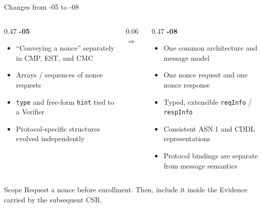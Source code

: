 \documentclass[aspectratio=169,10pt]{beamer}
\begin{document}
\begin{frame}{Changes from -05 to -08}
  \begin{columns}[T,onlytextwidth]
    \begin{column}{0.47\textwidth}
      \textbf{\color{darkgray}-05}
      \vspace{0.12cm}
      \begin{itemize}
        \item ``Conveying a nonce'' separately in CMP, EST, and CMC
        \item Arrays / sequences of nonce requests
        \item \texttt{type} and free-form \texttt{hint} tied to a Verifier
        \item Protocol-specific structures evolved independently
      \end{itemize}
    \end{column}
    \begin{column}{0.06\textwidth}
      \centering\vspace{1.3cm}
      {\color{accent}\Large$\Longrightarrow$}
    \end{column}
    \begin{column}{0.47\textwidth}
      \textbf{\color{ietfblue}-08}
      \vspace{0.12cm}
      \begin{itemize}
        \item One common architecture and message model
        \item One nonce request and one nonce response
        \item Typed, extensible \texttt{reqInfo} / \texttt{respInfo}
        \item Consistent ASN.1 and CDDL representations
        \item Protocol bindings are separate from message semantics
      \end{itemize}
    \end{column}
  \end{columns}
  \vspace{0.25cm}
  \begin{block}{Scope}
    Request a nonce before enrollment. Then, include it inside the
    Evidence carried by the subsequent CSR.
  \end{block}
\end{frame}
\end{document}
